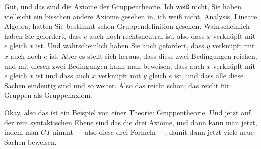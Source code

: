 \begin{spoken-clean}[01:24:55 - 01:26:11]
Gut, und das sind die Axiome der Gruppentheorie. Ich weiß nicht, Sie haben vielleicht ein bisschen andere Axiome gesehen in, ich weiß nicht, Analysis, Lineare Algebra; hatten Sie bestimmt schon Gruppendefinition gesehen. Wahrscheinlich haben Sie gefordert, dass $e$ auch noch rechtsneutral ist, also dass $x$ verknüpft mit $e$ gleich $x$ ist. Und wahrscheinlich haben Sie auch gefordert, dass $y$ verknüpft mit $x$ auch noch $e$ ist. Aber es stellt sich heraus, dass diese zwei Bedingungen reichen, und mit diesen zwei Bedingungen kann man beweisen, dass auch $x$ verknüpft mit $e$ gleich $x$ ist und dass auch $x$ verknüpft mit $y$ gleich $e$ ist, und dass alle diese Sachen eindeutig sind und so weiter. Also das reicht schon; das reicht für Gruppen als Gruppenaxiom.

Okay, also das ist ein Beispiel von einer Theorie: Gruppentheorie. Und jetzt auf der rein syntaktischen Ebene sind das die drei Axiome, und dann kann man jetzt, indem man $GT$ nimmt --- also diese drei Formeln ---, damit dann jetzt viele neue Sachen beweisen.
\end{spoken-clean}

